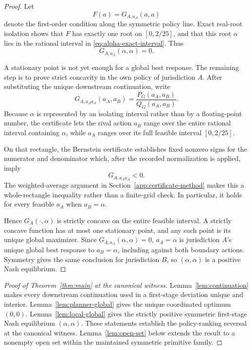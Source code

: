 \begin{proof}
Let
\[
F(a)=G_{A,a_A}(a,a)
\]
denote the first-order condition along the symmetric policy line. Exact real-root isolation shows that $F$ has exactly one root on $[0,2/25]$, and that this root $\alpha$ lies in the rational interval in \eqref{eq:alpha-exact-interval}. Thus
\[
G_{A,a_A}(\alpha,\alpha)=0.
\]

A stationary point is not yet enough for a global best response. The remaining step is to prove strict concavity in the own policy of jurisdiction $A$. After substituting the unique downstream continuation, write
\[
G_{A,a_Aa_A}(a_A,a_B)
=
\frac{P_G(a_A,a_B)}{Q_G(a_A,a_B)}.
\]
Because $\alpha$ is represented by an isolating interval rather than by a floating-point number, the certificate lets the rival action $a_B$ range over the entire rational interval containing $\alpha$, while $a_A$ ranges over its full feasible interval $[0,2/25]$.

On that rectangle, the Bernstein certificate establishes fixed nonzero signs for the numerator and denominator which, after the recorded normalization is applied, imply
\begin{equation}
G_{A,a_Aa_A}<0.
\end{equation}
The weighted-average argument in Section~\ref{app:certificate-method} makes this a whole-rectangle inequality rather than a finite-grid check. In particular, it holds for every feasible $a_A$ when $a_B=\alpha$.

Hence $G_A(\cdot,\alpha)$ is strictly concave on the entire feasible interval. A strictly concave function has at most one stationary point, and any such point is its unique global maximizer. Since $G_{A,a_A}(\alpha,\alpha)=0$, $a_A=\alpha$ is jurisdiction $A$'s unique global best response to $a_B=\alpha$, including against both boundary actions. Symmetry gives the same conclusion for jurisdiction $B$, so $(\alpha,\alpha)$ is a positive Nash equilibrium.
\end{proof}

\begin{proof}[Proof of Theorem~\ref{thm:main} at the canonical witness]
Lemma~\ref{lem:continuation} makes every downstream continuation used in a first-stage deviation unique and interior. Lemma~\ref{lem:planner-global} gives the unique coordinated optimum $(0,0)$. Lemma~\ref{lem:local-global} gives the strictly positive symmetric first-stage Nash equilibrium $(\alpha,\alpha)$. These statements establish the policy-ranking reversal at the canonical witness. Lemma~\ref{lem:open-set} below extends the result to a nonempty open set within the maintained symmetric primitive family.
\end{proof}

